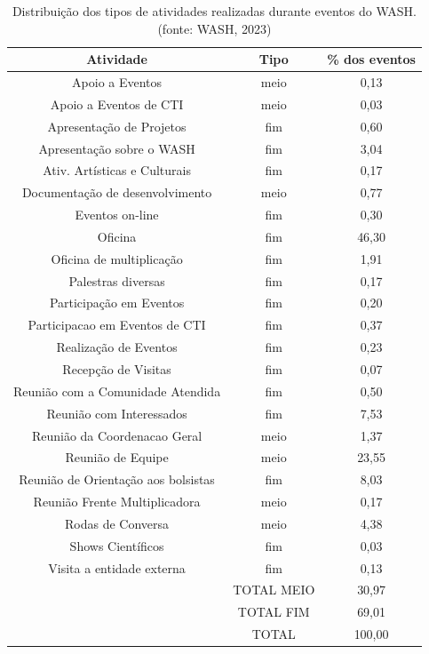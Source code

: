 \begin{table}[htb]
\tiny
\caption{\label{ad56a6a7e392bc429361f174f66a1af09330a2d9}Distribuição dos tipos de atividades realizadas durante eventos do WASH. (fonte: WASH, 2023)}

\centering
\begin{tabular}{|c|c|c|}
\hline
Atividade  &  Tipo  &  \% dos eventos \\
\hline
Apoio a Eventos  &  meio  &  0,13 \\
Apoio a Eventos de CTI  &  meio  &  0,03 \\
Apresentação de Projetos  &  fim  &  0,60 \\
Apresentação sobre o WASH  &  fim  &  3,04 \\
Ativ. Artísticas e Culturais  &  fim  &  0,17 \\
Documentação de desenvolvimento  &  meio  &  0,77 \\
Eventos on-line  &  fim  &  0,30 \\
Oficina  &  fim  &  46,30 \\
Oficina de multiplicação  &  fim  &  1,91 \\
Palestras diversas  &  fim  &  0,17 \\
Participação em Eventos  &  fim  &  0,20 \\
Participacao em Eventos de CTI  &  fim  &  0,37 \\
Realização de Eventos  &  fim  &  0,23 \\
Recepção de Visitas  &  fim  &  0,07 \\
Reunião com a Comunidade Atendida  &  fim  &  0,50 \\
Reunião com Interessados  &  fim  &  7,53 \\
Reunião da Coordenacao Geral  &  meio  &  1,37 \\
Reunião de Equipe  &  meio  &  23,55 \\
Reunião de Orientação aos bolsistas  &  fim  &  8,03 \\
Reunião Frente Multiplicadora  &  meio  &  0,17 \\
Rodas de Conversa  &  meio  &  4,38 \\
Shows Científicos  &  fim  &  0,03 \\
Visita a entidade externa  &  fim  &  0,13 \\
\hline
  &  TOTAL MEIO  &  30,97 \\
  &  TOTAL FIM  &  69,01  \\
  &  TOTAL  &  100,00 \\
\hline
\end{tabular}
\end{table}


